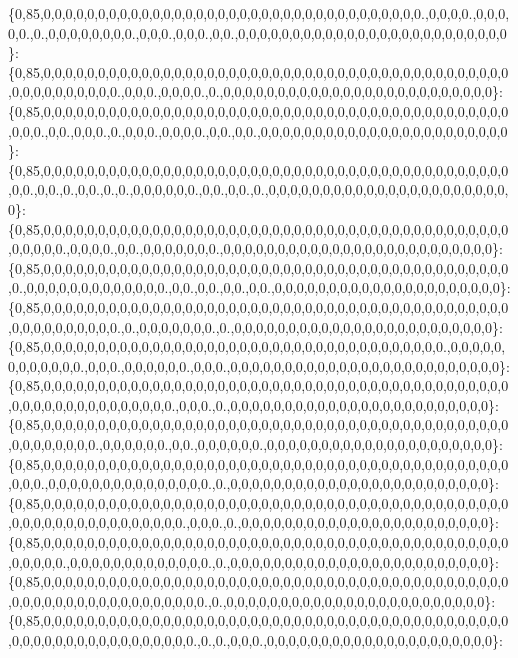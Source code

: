 \{0,85,0,0,0,0,0,0,0,0,0,0,0,0,0,0,0,0,0,0,0,0,0,0,0,0,0,0,0,0,0,0,0,0,0,0,0.,0,0,0,0.,0,0,0,0,0.,0.,0,0,0,0,0,0,0,0.,0,0,0.,0,0,0.,0,0.,0,0,0,0,0,0,0,0,0,0,0,0,0,0,0,0,0,0,0,0,0,0,0,0,0\}\+: \{0,85,0,0,0,0,0,0,0,0,0,0,0,0,0,0,0,0,0,0,0,0,0,0,0,0,0,0,0,0,0,0,0,0,0,0,0,0,0,0,0,0,0,0,0,0,0,0,0,0,0,0,0,0,0.,0,0,0.,0,0,0,0.,0.,0,0,0,0,0,0,0,0,0,0,0,0,0,0,0,0,0,0,0,0,0,0,0,0,0\}\+: \{0,85,0,0,0,0,0,0,0,0,0,0,0,0,0,0,0,0,0,0,0,0,0,0,0,0,0,0,0,0,0,0,0,0,0,0,0,0,0,0,0,0,0,0,0,0,0,0.,0,0.,0,0,0.,0.,0,0,0.,0,0,0,0.,0,0.,0,0.,0,0,0,0,0,0,0,0,0,0,0,0,0,0,0,0,0,0,0,0,0,0,0\}\+: \{0,85,0,0,0,0,0,0,0,0,0,0,0,0,0,0,0,0,0,0,0,0,0,0,0,0,0,0,0,0,0,0,0,0,0,0,0,0,0,0,0,0,0,0,0,0,0.,0,0.,0.,0,0.,0.,0.,0,0,0,0,0,0.,0,0.,0,0.,0.,0,0,0,0,0,0,0,0,0,0,0,0,0,0,0,0,0,0,0,0,0,0,0\}\+: \{0,85,0,0,0,0,0,0,0,0,0,0,0,0,0,0,0,0,0,0,0,0,0,0,0,0,0,0,0,0,0,0,0,0,0,0,0,0,0,0,0,0,0,0,0,0,0,0,0,0.,0,0,0,0.,0,0.,0,0,0,0,0,0,0.,0,0,0,0,0,0,0,0,0,0,0,0,0,0,0,0,0,0,0,0,0,0,0,0,0\}\+: \{0,85,0,0,0,0,0,0,0,0,0,0,0,0,0,0,0,0,0,0,0,0,0,0,0,0,0,0,0,0,0,0,0,0,0,0,0,0,0,0,0,0,0,0,0,0.,0,0,0,0,0,0,0,0,0,0,0,0,0.,0,0.,0,0.,0,0.,0,0.,0,0,0,0,0,0,0,0,0,0,0,0,0,0,0,0,0,0,0,0,0\}\+: \{0,85,0,0,0,0,0,0,0,0,0,0,0,0,0,0,0,0,0,0,0,0,0,0,0,0,0,0,0,0,0,0,0,0,0,0,0,0,0,0,0,0,0,0,0,0,0,0,0,0,0,0,0,0,0.,0.,0,0,0,0,0,0,0.,0.,0,0,0,0,0,0,0,0,0,0,0,0,0,0,0,0,0,0,0,0,0,0,0,0\}\+: \{0,85,0,0,0,0,0,0,0,0,0,0,0,0,0,0,0,0,0,0,0,0,0,0,0,0,0,0,0,0,0,0,0,0,0,0,0,0,0.,0,0,0,0,0,0,0,0,0,0,0,0.,0,0,0.,0,0,0,0,0,0.,0,0,0.,0,0,0,0,0,0,0,0,0,0,0,0,0,0,0,0,0,0,0,0,0,0,0,0,0\}\+: \{0,85,0,0,0,0,0,0,0,0,0,0,0,0,0,0,0,0,0,0,0,0,0,0,0,0,0,0,0,0,0,0,0,0,0,0,0,0,0,0,0,0,0,0,0,0,0,0,0,0,0,0,0,0,0,0,0,0,0,0.,0,0,0.,0.,0,0,0,0,0,0,0,0,0,0,0,0,0,0,0,0,0,0,0,0,0,0,0,0\}\+: \{0,85,0,0,0,0,0,0,0,0,0,0,0,0,0,0,0,0,0,0,0,0,0,0,0,0,0,0,0,0,0,0,0,0,0,0,0,0,0,0,0,0,0,0,0,0,0,0,0,0,0,0,0.,0,0,0,0,0,0.,0,0.,0,0,0,0,0,0.,0,0,0,0,0,0,0,0,0,0,0,0,0,0,0,0,0,0,0,0,0\}\+: \{0,85,0,0,0,0,0,0,0,0,0,0,0,0,0,0,0,0,0,0,0,0,0,0,0,0,0,0,0,0,0,0,0,0,0,0,0,0,0,0,0,0,0,0,0,0,0,0.,0,0,0,0,0,0,0,0,0,0,0,0,0,0,0.,0.,0,0,0,0,0,0,0,0,0,0,0,0,0,0,0,0,0,0,0,0,0,0,0,0\}\+: \{0,85,0,0,0,0,0,0,0,0,0,0,0,0,0,0,0,0,0,0,0,0,0,0,0,0,0,0,0,0,0,0,0,0,0,0,0,0,0,0,0,0,0,0,0,0,0,0,0,0,0,0,0,0,0,0,0,0,0,0,0.,0,0,0.,0.,0,0,0,0,0,0,0,0,0,0,0,0,0,0,0,0,0,0,0,0,0,0,0\}\+: \{0,85,0,0,0,0,0,0,0,0,0,0,0,0,0,0,0,0,0,0,0,0,0,0,0,0,0,0,0,0,0,0,0,0,0,0,0,0,0,0,0,0,0,0,0,0,0,0,0,0.,0,0,0,0,0,0,0,0,0,0,0,0,0.,0.,0,0,0,0,0,0,0,0,0,0,0,0,0,0,0,0,0,0,0,0,0,0,0,0\}\+: \{0,85,0,0,0,0,0,0,0,0,0,0,0,0,0,0,0,0,0,0,0,0,0,0,0,0,0,0,0,0,0,0,0,0,0,0,0,0,0,0,0,0,0,0,0,0,0,0,0,0,0,0,0,0,0,0,0,0,0,0,0,0,0.,0.,0,0,0,0,0,0,0,0,0,0,0,0,0,0,0,0,0,0,0,0,0,0,0,0\}\+: \{0,85,0,0,0,0,0,0,0,0,0,0,0,0,0,0,0,0,0,0,0,0,0,0,0,0,0,0,0,0,0,0,0,0,0,0,0,0,0,0,0,0,0,0,0,0,0,0,0,0,0,0,0,0,0,0,0,0,0,0,0,0.,0.,0.,0,0,0.,0,0,0,0,0,0,0,0,0,0,0,0,0,0,0,0,0,0,0,0,0\}\+: 